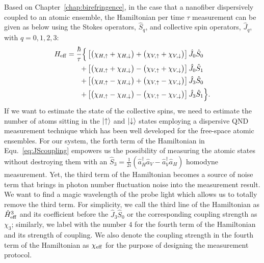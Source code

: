 Based on Chapter~\ref{chap:birefringence}, in the case that a nanofiber dispersively coupled to an atomic ensemble, the Hamiltonian per time $ \tau $ measurement can be given as below using the Stokes operators, $\hat{S}_q $, and collective spin operators, $ \hat{J}_q $, with $ q=0,1,2,3 $:
\begin{align}
H_{\rm eff} 
=\frac{\hbar}{\tau} \Big\{ & \left[ \big( \chi_{H,\uparrow} + \chi_{H,\downarrow}\big) + \big(\chi_{V,\uparrow} + \chi_{V,\downarrow}\big) \right] \hat{J}_0 \hat{S}_0 \nonumber \\
+ & \left[ \big( \chi_{H, \uparrow} + \chi_{H,\downarrow}\big) - \big( \chi_{V,\uparrow} + \chi_{V,\downarrow} \big)\right]  \hat{J}_0 \hat{S}_1 \nonumber \\
+ & \left[ \big( \chi_{H,\uparrow} - \chi_{H,\downarrow}\big) + \big(\chi_{V,\uparrow} - \chi_{V,\downarrow} \big) \right] \hat{J}_3 \hat{S}_0 \nonumber \\
+ & \left[ \big( \chi_{H,\uparrow} - \chi_{H,\downarrow}\big) - \big(\chi_{V,\uparrow} - \chi_{V,\downarrow} \big) \right]  \hat{J}_3 \hat{S}_1\Big\}.\label{eq:JScoupling}
\end{align}
If we want to estimate the state of the collective 
spins, we need to estimate the number of atoms sitting in the $ \lvert{\uparrow}\rangle $ and $ \lvert{\downarrow}\rangle 
$ states employing a dispersive QND measurement technique which has been well developed for the 
free-space atomic ensembles. For our system, the forth term of the Hamiltonian in 
Equ.~\eqref{eq:JScoupling} empowers us the possibility of measuring the atomic states without 
destroying them with an $ \hat{S}_3=\frac{1}{2i}(\hat{a}_H^\dagger\hat{a}_V - 
\hat{a}_V^\dagger\hat{a}_H) $ homodyne measurement. Yet, the third term of the Hamiltonian becomes 
a source of noise term that brings in photon number fluctuation noise into the measurement result. We want to find a magic wavelength of the probe light which allows us to totally remove the third term. For simplicity, we call the third line of the Hamiltonian as $ \hat{H}^3_{\rm eff} $ and its coefficient before the $ \hat{J}_3\hat{S}_0 $ or the corresponding coupling strength as $ \chi_3 $; similarly, we label with the number $ 4 $ for the fourth term of the Hamiltonian and its strength of coupling. We also denote the coupling strength in the fourth term of the Hamiltonian as $ \chi_{\rm eff} $ for the purpose of designing the measurement protocol.


